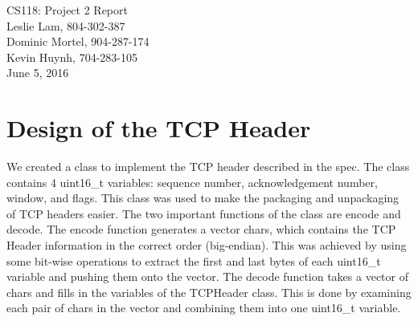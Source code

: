 \documentclass{article}
\begin{document}
\newcommand{\coverpage}{
  \onecolumn
  \begin{center}
    \LARGE\labtitle \\ \bigskip \bigskip \large\name
    \\ \bigskip \labdate
    \end{center}
  \setcounter{page}{1} }

\newcommand{\labtitle}{CS118: Project 2 Report}
\newcommand{\name}{Leslie Lam, 804-302-387 \\ Dominic Mortel, 904-287-174 \\
Kevin Huynh, 704-283-105}
\newcommand{\labdate}{June 5, 2016}

\coverpage

\section{Design of the TCP Header}
    We created a class to implement the TCP header described in the spec. The
    class contains 4 uint16\_t variables: sequence number, acknowledgement
    number, window, and flags. This class was used to make the packaging and
    unpackaging of TCP headers easier. The two important functions of the class
    are encode and decode. The encode function generates a vector chars, which
    contains the TCP Header information in the correct order (big-endian). This
    was achieved by using some bit-wise operations to extract the first and
    last bytes of each uint16\_t variable and pushing them onto the vector. The
    decode function takes a vector of chars and fills in the variables of the
    TCPHeader class. This is done by examining each pair of chars in the vector
    and combining them into one uint16\_t variable.
\end{document}
